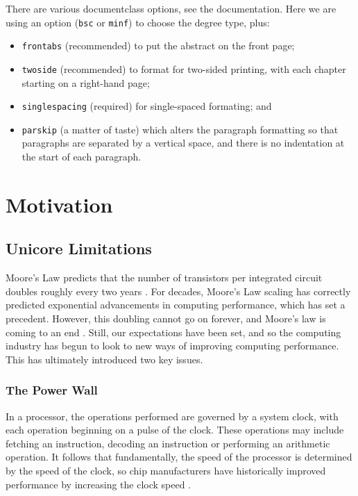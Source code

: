 \documentclass[bsc,frontabs,twoside,singlespacing,parskip,deptreport]{infthesis}     %
\begin{document}
There are various documentclass options, see the documentation.  Here we are
using an option ({\tt bsc} or {\tt minf}) to choose the degree type, plus:
\begin{itemize}
\item {\tt frontabs} (recommended) to put the abstract on the front page;
\item {\tt twoside} (recommended) to format for two-sided printing, with
  each chapter starting on a right-hand page;
\item {\tt singlespacing} (required) for single-spaced formating; and
\item {\tt parskip} (a matter of taste) which alters the paragraph formatting so that
paragraphs are separated by a vertical space, and there is no
indentation at the start of each paragraph.
\end{itemize}

\chapter{Motivation}

\section{Unicore Limitations} \label{unicore-limitations}
Moore’s Law predicts that the number of transistors per integrated circuit doubles roughly every two years \cite{moore_1998} \cite{moore_2006}. For decades, Moore’s Law scaling has correctly predicted exponential advancements in computing performance, which has set a precedent. However, this doubling cannot go on forever, and Moore’s law is coming to an end \cite{DBLP:journals/cse/TheisW17}. Still, our expectations have been set, and so the computing industry has begun to look to new ways of improving computing performance. This has ultimately introduced two key issues.

\subsection{The Power Wall} \label{the-power-wall}
In a processor, the operations performed are governed by a system clock, with each operation beginning on a pulse of the clock. These operations may include fetching an instruction, decoding an instruction or performing an arithmetic operation. It follows that fundamentally, the speed of the processor is determined by the speed of the clock, so chip manufacturers have historically improved performance by increasing the clock speed \cite{stallings}.
\end{document}
